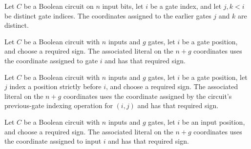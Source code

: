 \begin{theorem}
\label{FABL.BooleanCircuit.previousGateCoordinate_ne}
\leanok
{}
Let $C$ be a Boolean circuit on $n$ input bits, let $i$ be a gate index, and let $j,k<i$
be distinct gate indices. The coordinates assigned to the earlier gates $j$ and $k$ are
distinct.
\end{theorem}

\begin{definition}
\label{FABL.BooleanCircuit.gateLiteral}
\leanok
{}
Let $C$ be a Boolean circuit with $n$ inputs and $g$ gates, let $i$ be a gate position,
and choose a required sign. The associated literal on the $n+g$ coordinates uses the
coordinate assigned to gate $i$ and has that required sign.
\end{definition}

\begin{definition}
\label{FABL.BooleanCircuit.previousGateLiteral}
\leanok
{}
Let $C$ be a Boolean circuit with $n$ inputs and $g$ gates, let $i$ be a gate position,
let $j$ index a position strictly before $i$, and choose a required sign. The associated
literal on the $n+g$ coordinates uses the coordinate assigned by the circuit's
previous-gate indexing operation for $(i,j)$ and has that required sign.
\end{definition}

\begin{definition}
\label{FABL.BooleanCircuit.inputLiteral}
\leanok
{}
Let $C$ be a Boolean circuit with $n$ inputs and $g$ gates, let $i$ be an input
position, and choose a required sign. The associated literal on the $n+g$ coordinates
uses the coordinate assigned to input $i$ and has that required sign.
\end{definition}

